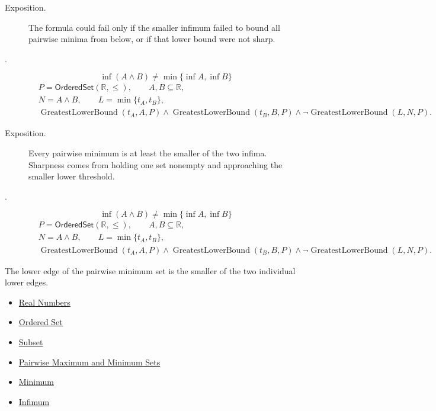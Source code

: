 \begin{remark*}
\begin{description}
\item[Exposition.]
The formula could fail only if the smaller infimum failed to bound all pairwise
minima from below, or if that lower bound were not sharp.


  \item[.]
  \[
\inf(A\wedge B)\neq\min\{\inf A,\inf B\}
\]
\[
\begin{aligned}
&P=\mathsf{OrderedSet}(\mathbb{R},\leq),\qquad A,B\subseteq\mathbb{R},\\
&N=A\wedge B,\qquad L=\min\{t_A,t_B\},\\
&\operatorname{GreatestLowerBound}(t_A,A,P)\land\operatorname{GreatestLowerBound}(t_B,B,P)\land
\neg\operatorname{GreatestLowerBound}(L,N,P).
\end{aligned}
\]
\end{description}
\end{remark*}

\begin{remark*}
\begin{description}
\item[Exposition.]
Every pairwise minimum is at least the smaller of the two infima.  Sharpness
comes from holding one set nonempty and approaching the smaller lower threshold.


  \item[.]
  \[
\inf(A\wedge B)\neq\min\{\inf A,\inf B\}
\]
\[
\begin{aligned}
&P=\mathsf{OrderedSet}(\mathbb{R},\leq),\qquad A,B\subseteq\mathbb{R},\\
&N=A\wedge B,\qquad L=\min\{t_A,t_B\},\\
&\operatorname{GreatestLowerBound}(t_A,A,P)\land\operatorname{GreatestLowerBound}(t_B,B,P)\land
\neg\operatorname{GreatestLowerBound}(L,N,P).
\end{aligned}
\]
\end{description}
\end{remark*}

\begin{remark*}[Interpretation]
The lower edge of the pairwise minimum set is the smaller of the two individual
lower edges.
\end{remark*}

\begin{dependencies}
\begin{itemize}
  \item \hyperref[def:reals]{Real Numbers}
  \item \hyperref[def:ordered-set]{Ordered Set}
  \item \hyperref[def:subset]{Subset}
  \item \hyperref[def:pairwise-maximum-minimum-sets]{Pairwise Maximum and Minimum Sets}
  \item \hyperref[def:minimum]{Minimum}
  \item \hyperref[def:infimum]{Infimum}
\end{itemize}
\end{dependencies}
